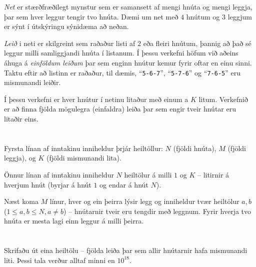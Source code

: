 \ifx\boi\undefined\fi
\def\version{jury-1}
{\em Net} er stærðfræðilegt mynstur sem er samansett af mengi hnúta og mengi leggja, þar sem hver leggur tengir tvo hnúta. Dæmi um net með $4$ hnútum og $3$ leggjum er sýnt í útskýringu sýnidæma að neðan.

{\em Leið} i neti er skilgreint sem raðaður listi af $2$ eða fleiri hnútum, þannig að það sé leggur milli samliggjandi hnúta í listanum.
Í þessu verkefni höfum við aðeins áhuga á {\em einföldum leiðum} þar sem enginn hnútur kemur fyrir oftar en einu sinni. Taktu eftir
að listinn er raðaður, til dæmis, ``\texttt{5-6-7}'', ``\texttt{5-7-6}'' og ``\texttt{7-6-5}'' eru mismunandi leiðir.


Í þessu verkefni er hver hnútur í netinu litaður með einum a $K$ litum. Verkefnið er að finna fjölda
mögulegra (einfaldra) leiða þar sem engir tveir hnútar eru litaðir eins.

\section*{}
Fyrsta línan af inntakinu inniheldur þrjár heiltöllur: $N$ (fjöldi hnúta), $M$ (fjöldi leggja), og $K$ (fjöldi mismunandi lita).


Önnur línan af inntakinu inniheldur $N$ heiltölur á milli $1$ og $K$ -- litirnir á hverjum hnút (byrjar á hnút $1$ og endar á hnút $N$).

Næst koma $M$ línur, hver og ein þeirra lýsir legg og inniheldur tvær heiltölur $a, b$ ($1 \le a, b \le N, a \neq b$) -- hnútarnir tveir eru tengdir með leggnum.
Fyrir hverja tvo hnúta er mesta lagi einn leggur á milli þeirra.

\section*{\outputsection}
Skrifaðu út eina heiltölu -- fjölda leiða þar sem allir hnútarnir hafa mismunandi liti. Þessi tala verður alltaf minni en $10^{18}$.

\section*{\constraints}
\testgroups


